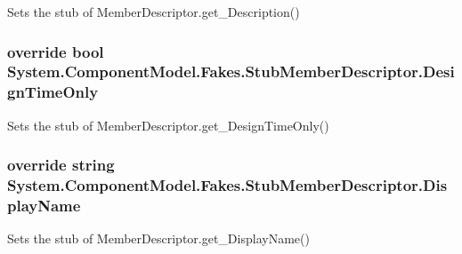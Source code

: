 Sets the stub of Member\-Descriptor.\-get\-\_\-\-Description()

\hypertarget{class_system_1_1_component_model_1_1_fakes_1_1_stub_member_descriptor_a426798fbd0f20dd62eddd959f62077e0}{
\subsubsection[{Design\-Time\-Only}]{\setlength{\rightskip}{0pt plus 5cm}override bool System.\-Component\-Model.\-Fakes.\-Stub\-Member\-Descriptor.\-Design\-Time\-Only\hspace{0.3cm}{\ttfamily [get]}}}\label{class_system_1_1_component_model_1_1_fakes_1_1_stub_member_descriptor_a426798fbd0f20dd62eddd959f62077e0}


Sets the stub of Member\-Descriptor.\-get\-\_\-\-Design\-Time\-Only()

\hypertarget{class_system_1_1_component_model_1_1_fakes_1_1_stub_member_descriptor_aee068f412343aa0e7f27258e20007de5}{
\subsubsection[{Display\-Name}]{\setlength{\rightskip}{0pt plus 5cm}override string System.\-Component\-Model.\-Fakes.\-Stub\-Member\-Descriptor.\-Display\-Name\hspace{0.3cm}{\ttfamily [get]}}}\label{class_system_1_1_component_model_1_1_fakes_1_1_stub_member_descriptor_aee068f412343aa0e7f27258e20007de5}


Sets the stub of Member\-Descriptor.\-get\-\_\-\-Display\-Name()

